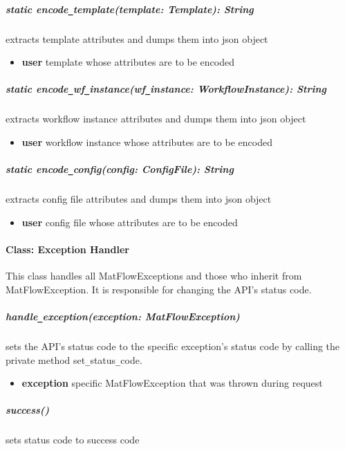 \subparagraph{static encode\texttt{\_}template(template: Template): String}
extracts template attributes and dumps them into json object
\begin{itemize}
        \item \textbf{user}
        template whose attributes are to be encoded
\end{itemize}

\subparagraph{static encode\texttt{\_}wf\texttt{\_}instance(wf\texttt{\_}instance: WorkflowInstance): String}
extracts workflow instance attributes and dumps them into json object
\begin{itemize}
        \item \textbf{user}
        workflow instance whose attributes are to be encoded
\end{itemize}

\subparagraph{static encode\texttt{\_}config(config: ConfigFile): String}
extracts config file attributes and dumps them into json object
\begin{itemize}
        \item \textbf{user}
        config file whose attributes are to be encoded
\end{itemize}

\paragraph{Class: Exception Handler}
This class handles all MatFlowExceptions and those who inherit from MatFlowException. It is  
responsible for changing the API's status code.

\subparagraph{handle\texttt{\_}exception(exception: MatFlowException)}
sets the API's status code to the specific exception's status code by calling the private method
set\texttt{\_}status\texttt{\_}code.
\begin{itemize}
        \item \textbf{exception}
        specific MatFlowException that was thrown during request
\end{itemize}

\subparagraph{success()}
sets status code to success code

